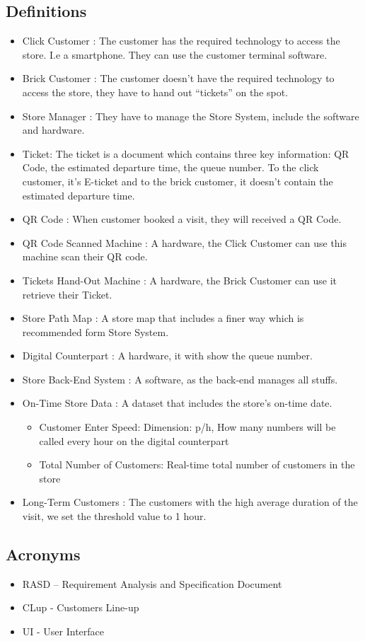 \documentclass[a4paper,12pt]{book}
\begin{document}
\subsection{Definitions}\label{Definitions}
\begin{itemize}
	\item Click Customer : The customer has the required technology to access the store. I.e a smartphone. They can use the customer terminal software.
	\item Brick Customer : The customer doesn't have the required technology to access the store, they have to hand out “tickets” on the spot.
	\item Store Manager : They have to manage the Store System, include the software and hardware.
	\item Ticket: The ticket is a document which contains three key information: QR Code, the estimated departure time, the queue number. To the click customer, it's E-ticket and to the brick customer, it doesn't contain the estimated departure time.
	\item QR Code : When customer booked a visit, they will received a QR Code.
	\item QR Code Scanned Machine : A hardware, the Click Customer can use this machine scan their QR code.
	\item Tickets Hand-Out Machine : A hardware, the Brick Customer can use it retrieve their Ticket.
	\item Store Path Map : A store map that includes a finer way which is recommended form Store System.
	\item Digital Counterpart : A hardware, it with show the queue number.
	\item Store Back-End System : A software, as the back-end manages all stuffs.
	\item On-Time Store Data : A dataset that includes the store's on-time date.
	\begin{itemize}
		\item Customer Enter Speed: Dimension: p/h, How many numbers will be called every hour on the digital counterpart
		\item Total Number of Customers: Real-time total number of customers in the store
	\end{itemize}
	\item Long-Term Customers : The customers with the high average duration of the visit, we set the threshold value to 1 hour.
\end{itemize}


\subsection{Acronyms}
\begin{itemize}
	\item RASD – Requirement Analysis and Specification Document
	\item CLup - Customers Line-up
	\item UI - User Interface
\end{itemize}
\end{document}
